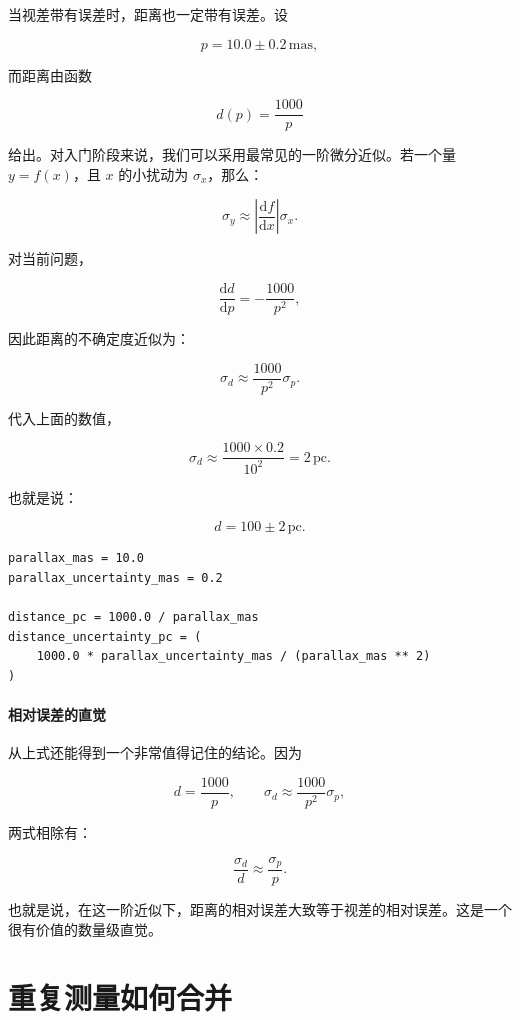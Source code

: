 当视差带有误差时，距离也一定带有误差。设

\[
p = 10.0 \pm 0.2\,\mathrm{mas},
\]

而距离由函数

\[
d(p)=\frac{1000}{p}
\]

给出。对入门阶段来说，我们可以采用最常见的一阶微分近似。若一个量 $y=f(x)$，且 $x$ 的小扰动为 $\sigma_x$，那么：

\[
\sigma_y \approx \left|\frac{\mathrm{d}f}{\mathrm{d}x}\right| \sigma_x.
\]

对当前问题，

\[
\frac{\mathrm{d}d}{\mathrm{d}p} = -\frac{1000}{p^2},
\]

因此距离的不确定度近似为：

\[
\sigma_d \approx \frac{1000}{p^2}\sigma_p.
\]

代入上面的数值，

\[
\sigma_d \approx \frac{1000 \times 0.2}{10^2} = 2\,\mathrm{pc}.
\]

也就是说：

\[
d = 100 \pm 2\,\mathrm{pc}.
\]

\begin{examplebox}[估计距离不确定度]
\begin{lstlisting}[style=pythonstyle]
parallax_mas = 10.0
parallax_uncertainty_mas = 0.2

distance_pc = 1000.0 / parallax_mas
distance_uncertainty_pc = (
    1000.0 * parallax_uncertainty_mas / (parallax_mas ** 2)
)
\end{lstlisting}
\end{examplebox}

\paragraph{相对误差的直觉}

从上式还能得到一个非常值得记住的结论。因为

\[
d = \frac{1000}{p}, \qquad \sigma_d \approx \frac{1000}{p^2}\sigma_p,
\]

两式相除有：

\[
\frac{\sigma_d}{d} \approx \frac{\sigma_p}{p}.
\]

也就是说，在这一阶近似下，距离的相对误差大致等于视差的相对误差。这是一个很有价值的数量级直觉。

\section{重复测量如何合并}

